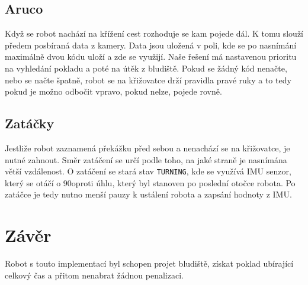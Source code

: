 \documentclass{article}
\begin{document}
\subsection{Aruco}
Když se robot nachází na křížení cest rozhoduje se kam pojede dál. K tomu slouží předem posbíraná data z kamery. Data jsou uložená v poli, kde se po nasnímání maximálně dvou kódu uloží a zde se využijí. Naše řešení má nastavenou prioritu na vyhledání pokladu a poté na útěk z bludiště. Pokud se žádný kód nenačte, nebo se načte špatně, robot se na křižovatce drží pravidla pravé ruky a to tedy pokud je možno odbočit vpravo, pokud nelze, pojede rovně. 

\subsection{Zatáčky}
Jestliže robot zaznamená překážku před sebou a nenachází se na křižovatce, je nutné zahnout. Směr zatáčení se určí podle toho, na jaké straně je nasnímána větší vzdálenost. O zatáčení se stará stav \verb|TURNING|, kde se využívá IMU senzor, který se otáčí o 90\degree oproti úhlu, který byl stanoven po poslední otočce robota. Po zatáčce je tedy nutno menší pauzy k ustálení robota a zapsání hodnoty z IMU.

\section{Závěr}
Robot s touto implementací byl schopen projet bludiště, získat poklad ubírající celkový čas a přitom nenabrat žádnou penalizaci.
\end{document}
